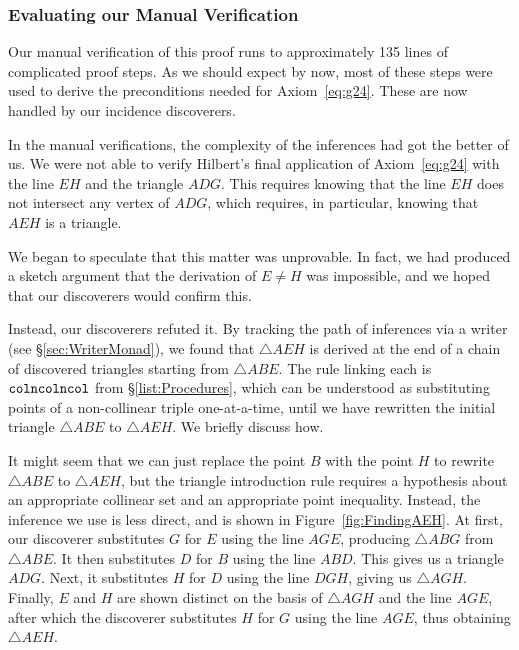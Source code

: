 \subsubsection{Evaluating our Manual Verification}\label{sec:FindingAEH}
Our manual verification of this proof runs to approximately 135 lines of complicated proof steps. As we should expect by now, most of these steps were used to derive the preconditions needed for Axiom~\ref{eq:g24}. These are now handled by our incidence discoverers.

In the manual verifications, the complexity of the inferences had got the better of us. We were not able to verify Hilbert's final application of Axiom~\ref{eq:g24} with the line $EH$ and the triangle $ADG$. This requires knowing that the line $EH$ does not intersect any vertex of $ADG$, which requires, in particular, knowing that $AEH$ is a triangle.

We began to speculate that this matter was unprovable. In fact, we had produced a sketch argument that the derivation of $E\neq H$ was impossible, and we hoped that our discoverers would confirm this.

\label{sec:CombinatoryError}Instead, our discoverers refuted it. By tracking the path of inferences via a writer (see \S\ref{sec:WriterMonad}), we found that $\triangle AEH$ is derived at the end of a chain of discovered triangles starting from $\triangle ABE$. The rule linking each is $\texttt{colncolncol}$ from \S\ref{list:Procedures}, which can be understood as substituting points of a non-collinear triple one-at-a-time, until we have rewritten the initial triangle $\triangle ABE$ to $\triangle AEH$. We briefly discuss how.

It might seem that we can just replace the point $B$ with the point $H$ to rewrite $\triangle ABE$ to $\triangle AEH$, but the triangle introduction rule requires a hypothesis about an appropriate collinear set and an appropriate point inequality. Instead, the inference we use is less direct, and is shown in Figure~\ref{fig:FindingAEH}. At first, our discoverer substitutes $G$ for $E$ using the line $AGE$, producing $\triangle ABG$ from $\triangle ABE$. It then substitutes $D$ for $B$ using the line $ABD$. This gives us a triangle $ADG$. Next, it substitutes $H$ for $D$ using the line $DGH$, giving us $\triangle AGH$. Finally, $E$ and $H$ are shown distinct on the basis of $\triangle AGH$ and the line $AGE$, after which the discoverer substitutes $H$ for $G$ using the line $AGE$, thus obtaining $\triangle AEH$.

